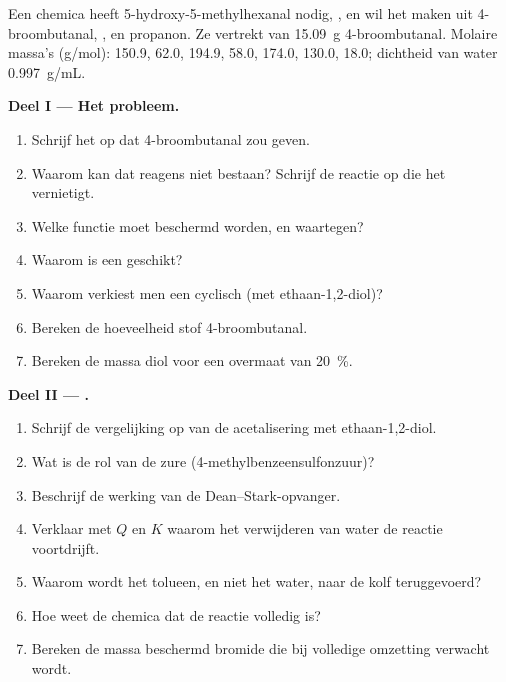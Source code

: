 \begin{problem}
\label{pb:b1:acetals-protection:1}
Een chemica heeft 5-hydroxy-5-methylhexanal nodig,
, en wil het maken uit 4-broombutanal,
, en propanon. Ze vertrekt van \qty{15.09}{g}
4-broombutanal. Molaire massa's (\unit{g/mol}):  150.9,
 62.0,  194.9,  58.0, 
174.0,  130.0,  18.0; dichtheid van water
\qty{0.997}{g/mL}.

\medskip
\noindent\textbf{Deel I --- Het probleem.}
\begin{enumerate}
  \item Schrijf het  op dat 4-broombutanal zou geven.
  \item Waarom kan dat reagens niet bestaan? Schrijf de reactie op die het
        vernietigt.
  \item Welke functie moet beschermd worden, en waartegen?
  \item Waarom is een  geschikt?
  \item Waarom verkiest men een cyclisch  (met ethaan-1,2-diol)?
  \item Bereken de hoeveelheid stof 4-broombutanal.
  \item Bereken de massa diol voor een overmaat van \qty{20}{\percent}.
\end{enumerate}

\medskip
\noindent\textbf{Deel II --- .}
\begin{enumerate}[resume]
  \item Schrijf de vergelijking op van de acetalisering met
        ethaan-1,2-diol.
  \item Wat is de rol van de zure 
        (4-methylbenzeensulfonzuur)?
  \item Beschrijf de werking van de Dean--Stark-opvanger.
  \item Verklaar met $Q$ en $K$ waarom het verwijderen van water de
        reactie voortdrijft.
  \item Waarom wordt het tolueen, en niet het water, naar de kolf
        teruggevoerd?
  \item Hoe weet de chemica dat de reactie volledig is?
  \item Bereken de massa beschermd bromide die bij volledige omzetting
        verwacht wordt.
\end{enumerate}


\end{problem}
